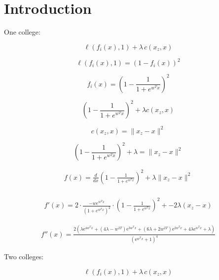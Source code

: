 \documentclass{article}
\begin{document}
\section{Introduction}

One college:

\begin{equation}
\ell(f_i(x), 1) + \lambda \, c(x_z, x)
\end{equation}

\begin{equation}
\ell(f_i(x), 1) = (1 - f_i(x))^2
\end{equation}

\begin{equation}
f_i(x) = (1-\frac{1}{1+e^{w^T x}})^2
\end{equation}

\begin{equation}
(1-\frac{1}{1+e^{w^T x}})^2 + \lambda c(x_z, x)
\end{equation}

\begin{equation}
c(x_z, x) = \|x_z - x\|^2 
\end{equation}

\begin{equation}
(1-\frac{1}{1+e^{w^T x}})^2 + \lambda =\|x_z - x\|^2 
\end{equation}

\begin{align}
f(x) = \frac{d}{dx}(1-\frac{1}{1+e^{w^T x}})^2 + \lambda \|x_z - x\|^2 \\ 
\end{align}

\begin{align}
f'(x)= 2 \cdot \frac{-we^{w^Tx}}{ (1 + e^{w^T x})^2 } \cdot (1-\frac{1}{1+e^{w^T x}})^2 + -2\lambda (x_z - x)
\end{align}

\begin{align}
f''(x) = \frac{2 \left({\lambda}\mathrm{e}^{4w^{T} x} + \left(4{\lambda} - w^{2T}\right) \mathrm{e}^{3w^{T} x} + \left(6{\lambda} + 2w^{2T}\right) \mathrm{e}^{2w^{T} x} + 4{\lambda}\mathrm{e}^{w^{T} x} + {\lambda}\right)}{\left(\mathrm{e}^{w^{T} x} + 1\right)^{4}}
\end{align}

Two colleges:

\begin{equation}
\ell(f_i(x), 1) + \lambda \, c(x_z, x)
\end{equation}
\end{document}
